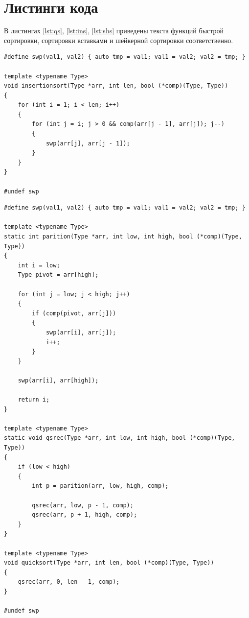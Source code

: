 \section{Листинги кода}

В листингах \ref{lst:qs}, \ref{lst:ins}, \ref{lst:shs} приведены текста функций быстрой сортировки, сортировки вставками и шейкерной сортировки соответственно.

\noindent\begin{minipage}{\textwidth}
\begin{lstlisting}[caption=Сортировка вставками, label=lst:ins]
#define swp(val1, val2) { auto tmp = val1; val1 = val2; val2 = tmp; }

template <typename Type>
void insertionsort(Type *arr, int len, bool (*comp)(Type, Type))
{
    for (int i = 1; i < len; i++)
    {
        for (int j = i; j > 0 && comp(arr[j - 1], arr[j]); j--)
        {
            swp(arr[j], arr[j - 1]);
        }
    }
}

#undef swp
\end{lstlisting}
\end{minipage}

\noindent\begin{minipage}{\textwidth}
\begin{lstlisting}[caption=Бастрая сортировка, label=lst:qs]
#define swp(val1, val2) { auto tmp = val1; val1 = val2; val2 = tmp; }

template <typename Type>
static int parition(Type *arr, int low, int high, bool (*comp)(Type, Type))
{
    int i = low;
    Type pivot = arr[high];

    for (int j = low; j < high; j++)
    {
        if (comp(pivot, arr[j]))
        {
            swp(arr[i], arr[j]);
            i++;
        }
    }

    swp(arr[i], arr[high]);

    return i;
}

template <typename Type>
static void qsrec(Type *arr, int low, int high, bool (*comp)(Type, Type))
{
    if (low < high)
    {
        int p = parition(arr, low, high, comp);

        qsrec(arr, low, p - 1, comp);
        qsrec(arr, p + 1, high, comp);
    }
}

template <typename Type>
void quicksort(Type *arr, int len, bool (*comp)(Type, Type))
{
    qsrec(arr, 0, len - 1, comp);
}

#undef swp
\end{lstlisting}
\end{minipage}

